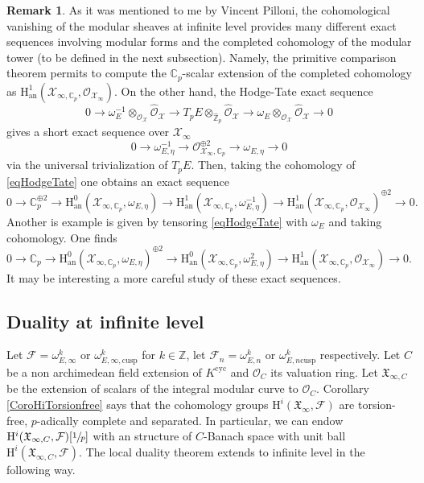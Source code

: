 \documentclass[11pt]{article}
\let\ra\rightarrow
\newcommand{\an}{\mathrm{an}}
\newcommand{\cusp}{\mathrm{cusp}}
\newcommand{\cyc}{\mathrm{cyc}}
\numberwithin{equation}{section}
\theoremstyle{definition}
\newtheorem{remark}[prop]{Remark}
\newcommand{\bb}[1]{\mathbb{#1}}
\newcommand{\n}[1]{\mathcal{#1}}
\newcommand{\f}[1]{\mathfrak{#1}}
\newcommand{\s}[1]{\mathscr{#1}}
\begin{document}
\begin{remark}
As it was mentioned to me by Vincent Pilloni, the cohomological vanishing of the modular sheaves at infinite level provides many different exact sequences involving modular forms and the completed cohomology of the modular tower (to be defined in the next subsection). Namely, the primitive comparison theorem permits to compute the $\bb{C}_p$-scalar extension of the completed cohomology as $\mathrm{H}_{\an}^1(\n{X}_{\infty,\bb{C}_p}, \s{O}_{\n{X}_\infty})$. On the other hand, the Hodge-Tate exact sequence
\[
0\to \omega_E^{-1} \otimes_{\s{O}_{\n{X}}} \widehat{\s{O}}_{\n{X}} \to T_pE \otimes_{\widehat{\bb{Z}}_p} \widehat{\s{O}}_{\n{X}} \to \omega_E\otimes_{\s{O}_{\n{X}}}\widehat{\s{O}}_{\n{X}} \to 0
\]
gives a short exact sequence over $\n{X}_{\infty}$
\begin{equation}
\label{eqHodgeTate}
0\to \omega^{-1}_{E,\eta } \to \s{O}_{\n{X}_\infty,\bb{C}_p}^{\oplus 2} \to \omega_{E,\eta} \to 0
\end{equation}
via the universal trivialization of $T_pE$. Then, taking the cohomology of \eqref{eqHodgeTate} one obtains an exact sequence
\[
0\ra \bb{C}_p^{\oplus 2}\ra \mathrm{H}_{\an}^0(\n{X}_{\infty,\bb{C}_p}, \omega_{E,\eta}) \to \mathrm{H}_{\an}^1(\n{X}_{\infty,\bb{C}_p}, \omega_{E,\eta}^{-1}) \to \mathrm{H}_{\an}^1(\n{X}_{\infty,\bb{C}_p} , \s{O}_{\n{X}_{\infty}})^{\oplus 2}\ra 0.
\]
Another is example is given by tensoring \eqref{eqHodgeTate} with $\omega_{E}$ and taking cohomology. One finds
\[
0\ra \bb{C}_p \ra \mathrm{H}_{\an}^0(\n{X}_{\infty,\bb{C}_p}, \omega_{E,\eta})^{\oplus 2} \to \mathrm{H}_{\an}^0(\n{X}_{\infty,\bb{C}_p}, \omega_{E,\eta}^{2}) \to \mathrm{H}_{\an}^1(\n{X}_{\infty,\bb{C}_p} , \s{O}_{\n{X}_{\infty}}) \ra 0.
\]
It may be interesting a more careful study of these exact sequences.
\end{remark}

\subsection*{Duality at infinite level}

Let $\n{F}=\omega^k_{E,\infty}$ or $\omega^{k}_{E,\infty,\cusp}$ for $k\in \bb{Z}$, let $\n{F}_n= \omega^k_{E,n}$ or $\omega^k_{E,n \cusp}$ respectively. Let $C$ be a non archimedean field extension of $K^{\cyc}$ and $\n{O}_C$ its valuation ring. Let $\f{X}_{\infty,C}$ be the extension of scalars of the integral modular curve to $\n{O}_C$. Corollary \ref{CoroHiTorsionfree} says that the cohomology groups $\mathrm{H}^i(\f{X}_{\infty}, \n{F})$ are torsion-free, $p$-adically complete and separated. In particular, we can endow $\mathrm{H}^i(\f{X}_{\infty, C}, \n{F})[\sfrac{1}{p}]$ with an structure of $C$-Banach space with unit ball $\mathrm{H}^i(\f{X}_{\infty,C}, \n{F})$. The local duality theorem extends to infinite level in the following way.
\end{document}
